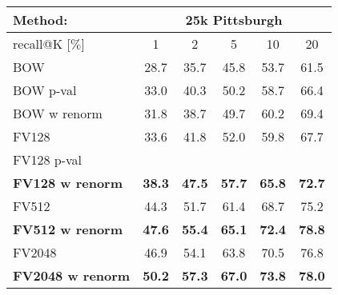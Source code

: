 \begin{table}[t!]
\begin{centering}
	\begin{tabularx}{0.89\linewidth}{|l|c c c c c|}
		\hline 
		\rowcolor{maroon!50}
		Method: & \multicolumn{5}{c|}{25k Pittsburgh} \\
		\hline 
		\hline 
		\rowcolor{maroon!50}
		recall@K [$\%$] & 1 & 2 & 5 & 10 & 20 \\
		\hline
		\rowcolor{maroon!10}
		BOW           & 28.7  & 35.7  & 45.8 & 53.7   & 61.5 \\
        \rowcolor{maroon!10}
		BOW p-val     & 33.0  & 40.3  & 50.2 & 58.7   &  66.4 \\
        \rowcolor{maroon!10}
		BOW w renorm  & 31.8  & 38.7  & 49.7 & 60.2   & 69.4 \\
        \hline
		\rowcolor{maroon!10}
		FV128         & 33.6  & 41.8  & 52.0 & 59.8   & 67.7  \\
		\rowcolor{maroon!10}
		FV128 p-val                 & \textbf{}       & \textbf{}     & \textbf{}     & \textbf{}     & \textbf{}  \\
    \rowcolor{maroon!10}
		\textbf{FV128 w renorm}     & \textbf{38.3}   & \textbf{47.5} & \textbf{57.7} & \textbf{65.8} & \textbf{72.7}  \\
    \hline  
    \rowcolor{maroon!10}
    FV512         & 44.3 & 51.7   & 61.4  & 68.7   & 75.2  \\
    \rowcolor{maroon!10}
    \textbf{FV512 w renorm}   & \textbf{47.6}  & \textbf{55.4} & \textbf{65.1} & \textbf{72.4} & \textbf{78.8}  \\
    \hline
		\rowcolor{maroon!10}
		FV2048        & 46.9  & 54.1  & 63.8  & 70.5    & 76.8 \\
		\rowcolor{maroon!10}
        \rowcolor{maroon!10}
        \textbf{FV2048 w renorm}  & \textbf{50.2} & \textbf{57.3} & \textbf{67.0} & \textbf{73.8} & \textbf{78.0} \\
        \hline

\end{tabularx}
\end{centering}
\end{table}
